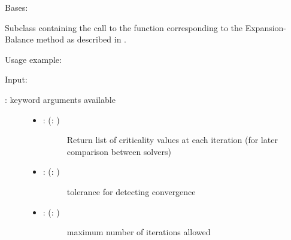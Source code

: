 \documentclass[a4paper,10pt,english]{sphinxmanual}
\begin{document}
\begin{fulllineitems}
\label{\detokenize{skprocrustes:skprocrustes.EBSolver}}
Bases: 

Subclass containing the call to the  function 
corresponding to the Expansion-Balance method as described in 
{\hyperref[\detokenize{index:bibliography}]{}}.

Usage example:

\begin{sphinxVerbatim}[commandchars=\\\{\}]
  
  
\end{sphinxVerbatim}

Input:
\begin{description}
\item[{: keyword arguments available}] \leavevmode\begin{itemize}
\item {} \begin{description}
\item[{: (: )}] \leavevmode
Return list of criticality values at each iteration (for later
comparison between solvers)

\end{description}

\item {} \begin{description}
\item[{: (: )}] \leavevmode
tolerance for detecting convergence

\end{description}

\item {} \begin{description}
\item[{: (: )}] \leavevmode
maximum number of iterations allowed


\end{description}
\end{itemize}
\end{description}
\end{fulllineitems}
\end{document}
